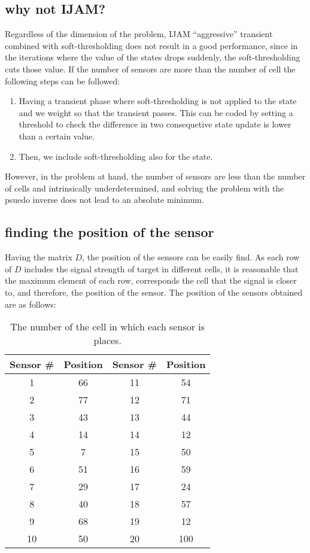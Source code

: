 \subsection{why not IJAM?}
Regardless of the dimension of the problem, IJAM ``aggressive'' transient combined with soft-thresholding does not result in a good performance, since in the iterations where the value of the states drops suddenly, the soft-thresholding cuts those value. If the number of sensors are more than the number of cell the following steps can be followed:

\begin{enumerate}
	\item Having a transient phase where soft-thresholding is not applied to the state and we weight so that the transient passes. This can be coded by setting a threshold to check the difference in two consequetive state update is lower than a certain value.
	\item Then, we include soft-thresholding also for the state.
\end{enumerate}

However, in the problem at hand, the number of sensors are less than the number of cells and intrinsically underdetermined, and solving the problem with the psuedo inverse does not lead to an absolute minimum. 

\subsection{finding the position of the sensor}
Having the matrix $D$, the position of the sensors can be easily find. As each row of $D$ includes the signal strength of target in different cells, it is reasonable that the maximum element of each row, corresponds the cell that the signal is closer to, and therefore, the position of the sensor. The position of the sensors obtained are as follows:

\begin{table}[ht]
\centering
\caption{The number of the cell in which each sensor is places.}
\label{tab:sensor_positions}
\begin{tabular}{cc|cc}
\hline
\textbf{Sensor \#} & \textbf{Position} & \textbf{Sensor \#} & \textbf{Position} \\ \hline
1  & 66  & 11 & 54  \\
2  & 77  & 12 & 71  \\
3  & 43  & 13 & 44  \\
4  & 14  & 14 & 12  \\
5  & 7   & 15 & 50  \\
6  & 51  & 16 & 59  \\
7  & 29  & 17 & 24  \\
8  & 40  & 18 & 57  \\
9  & 68  & 19 & 12  \\
10 & 50  & 20 & 100 \\ \hline
\end{tabular}
\end{table}

